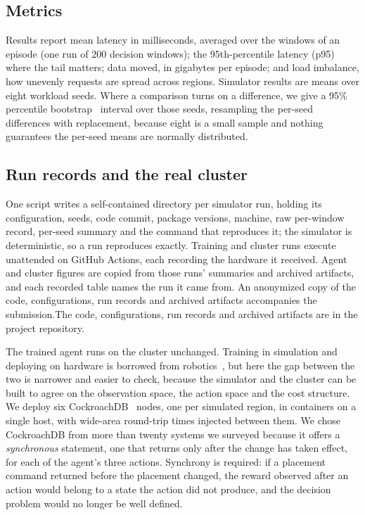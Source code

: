 \subsection{Metrics}\label{sec:metrics}

Results report mean latency in milliseconds, averaged over the windows of an
episode (one run of 200 decision windows); the 95th-percentile latency (p95)
where the tail matters; data moved, in gigabytes per episode; and load
imbalance, how unevenly requests are spread across regions. Simulator results
are means over eight workload seeds. Where a comparison turns on a difference,
we give a 95\% percentile bootstrap~\cite{efron1979bootstrap} interval over
those seeds, resampling the per-seed differences with replacement, because
eight is a small sample and nothing guarantees the per-seed means are normally
distributed.

\subsection{Run records and the real cluster}

One script writes a self-contained directory per simulator run, holding its
configuration, seeds, code commit, package versions, machine, raw per-window
record, per-seed summary and the command that reproduces it; the simulator is deterministic, so a run reproduces
exactly. Training and cluster runs execute unattended on GitHub Actions, each
recording the hardware it received. Agent and cluster figures are copied from
those runs' summaries and archived artifacts, and each recorded table names
the run it came from. \ifanonymous An anonymized copy of the code, configurations, run records and archived artifacts accompanies the submission.\else The code, configurations, run records and archived artifacts are in the project repository.\fi

The trained agent runs on the cluster unchanged. Training in simulation and
deploying on hardware is borrowed from robotics~\cite{tobin2017domain}, but here
the gap between the two is narrower and easier to check, because
the simulator and the cluster can be built to agree on the observation space,
the action space and the cost structure. We deploy six
CockroachDB~\cite{taft2020cockroachdb} nodes, one per simulated region, in
containers on a single host, with wide-area round-trip times injected between
them. We chose CockroachDB from more than twenty systems we surveyed because it
offers a \emph{synchronous} statement, one that returns only after the change
has taken effect, for each of the agent's three actions. Synchrony is required:
if a placement command returned before the placement changed, the reward
observed after an action would belong to a state the action did not produce,
and the decision problem would no longer be well defined.


